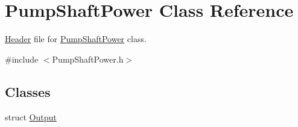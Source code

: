 \hypertarget{class_pump_shaft_power}{}\section{Pump\+Shaft\+Power Class Reference}
\label{class_pump_shaft_power}


\hyperlink{class_header}{Header} file for \hyperlink{class_pump_shaft_power}{Pump\+Shaft\+Power} class.  




{\ttfamily \#include $<$Pump\+Shaft\+Power.\+h$>$}

\subsection*{Classes}
\begin{DoxyCompactItemize}
\item 
struct \hyperlink{struct_pump_shaft_power_1_1_output}{Output}
\end{DoxyCompactItemize}
